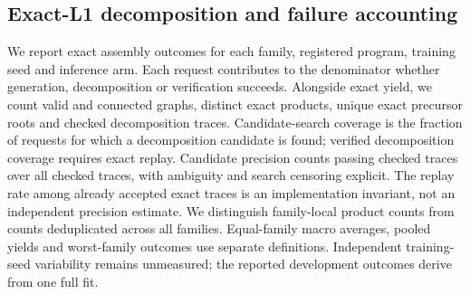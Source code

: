 \subsection{Exact-L1 decomposition and failure accounting}
We report exact assembly outcomes for each family, registered program, training seed and inference
arm. Each request contributes to the denominator whether generation, decomposition or verification
succeeds. Alongside exact yield, we count valid and connected graphs, distinct exact products,
unique exact precursor roots and checked decomposition traces.
Candidate-search coverage is the fraction of requests for which a decomposition candidate is found;
verified decomposition coverage requires exact replay. Candidate precision counts passing checked
traces over all checked traces, with ambiguity and search censoring explicit. The replay rate among
already accepted exact traces is an implementation invariant, not an independent precision estimate.
We distinguish family-local product counts from counts deduplicated across all families. Equal-family
macro averages, pooled yields and worst-family outcomes use separate definitions. Independent training-seed variability remains unmeasured; the reported development outcomes derive from one full fit.

